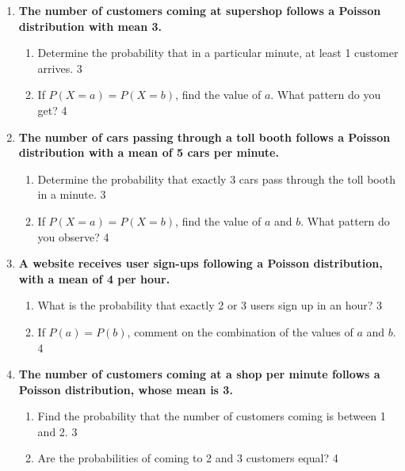 \documentclass[a4paper,oneside, margin=1.4in]{book}
\begin{document}
\begin{enumerate}
   \item
	  \textbf{The number of customers coming at supershop follows a Poisson 
	  distribution with mean 3.} 
  
  \begin{enumerate}
    \item  
	Determine the probability that in a particular minute, at least 1 customer 
	arrives. \hfill 3
    \item
	If $P(X = a) = P(X= b)$, find the value of $a$. What pattern do you get?
	\hfill 4
  \end{enumerate}
  
  \item
	  \textbf{The number of cars passing through a toll booth follows a 
	  Poisson distribution with a mean of 5 cars per minute.} 
  
  \begin{enumerate}
    \item  
	Determine the probability that exactly 3 cars pass through the toll 
	booth in a minute. \hfill 3
    \item
	If $P(X = a) = P(X = b)$, find the value of $a$ and $b$. What pattern do 
	you observe? \hfill 4
  \end{enumerate}
  
  \item
  \textbf{A website receives user sign-ups following a Poisson distribution, with a mean of 4 per hour.}  
  
  \begin{enumerate}
    \item  
      What is the probability that exactly 2 or 3 users sign up in an hour? \hfill 3  
    \item  
      If $P(a) = P(b)$, comment on the combination of the values of $a$ and $b$. \hfill 4  
  \end{enumerate}


  
  \item
	  \textbf{The number of customers coming at a shop per minute follows a 
	  Poisson distribution,  whose mean is 3.} 
  
  \begin{enumerate}

    \item  
	Find the probability that the number of customers coming is between 1 and 2. \hfill 3
    \item
	Are the probabilities of coming to 2 and 3 customers equal?  \hfill 4
  \end{enumerate}


\end{enumerate}
\end{document}
